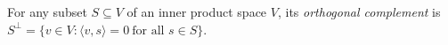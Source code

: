 
For any subset $S\subseteq V$ of an inner product space $V$, its \emph{orthogonal complement} is $S^\perp=\{v\in V:\langle v,s\rangle=0\ \text{for all }s\in S\}$.
